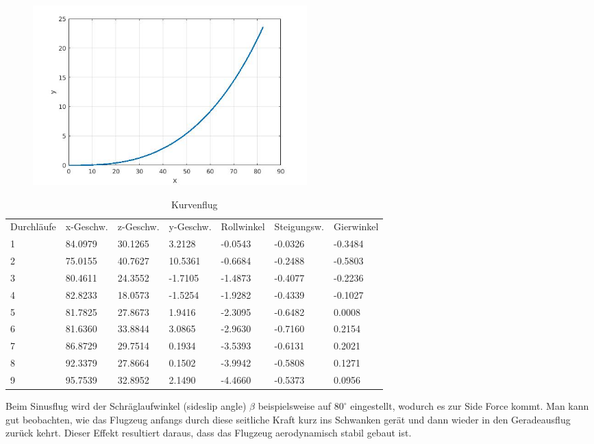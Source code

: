 \documentclass[a4paper,12pt]{scrartcl}
\begin{document}
\begin{figure}[htp]
	\centering
	\includegraphics[width=300pt]{Kurve4.jpg}
	\label{fig:k4}
\end{figure}
\begin{table}
\centering
\caption{Kurvenflug}
\begin{tabular}{lllllll}
Durchläufe & x-Geschw. & z-Geschw. & y-Geschw. & Rollwinkel & Steigungsw. & Gierwinkel  \\
1          & 84.0979   & 30.1265   & 3.2128    & -0.0543    & -0.0326     & -0.3484     \\
2          & 75.0155   & 40.7627   & 10.5361   & -0.6684    & -0.2488     & -0.5803     \\
3          & 80.4611   & 24.3552   & -1.7105   & -1.4873    & -0.4077     & -0.2236     \\
4          & 82.8233   & 18.0573   & -1.5254   & -1.9282    & -0.4339     & -0.1027     \\
5          & 81.7825   & 27.8673   & 1.9416    & -2.3095    & -0.6482     & 0.0008      \\
6          & 81.6360   & 33.8844   & 3.0865    & -2.9630    & -0.7160     & 0.2154      \\
7          & 86.8729   & 29.7514   & 0.1934    & -3.5393    & -0.6131     & 0.2021      \\
8          & 92.3379   & 27.8664   & 0.1502    & -3.9942    & -0.5808     & 0.1271      \\
9          & 95.7539   & 32.8952   & 2.1490    & -4.4660    & -0.5373     & 0.0956     
\end{tabular}
\end{table}
\newpage
Beim Sinusflug wird der Schräglaufwinkel (sideslip angle) \(\beta\) beispielsweise auf \(80^\circ\) eingestellt, wodurch es
zur Side Force kommt. Man kann gut beobachten, wie das Flugzeug anfangs durch diese
seitliche Kraft kurz ins Schwanken gerät und dann wieder in den Geradeausflug zurück
kehrt. Dieser Effekt resultiert daraus, dass das Flugzeug aerodynamisch stabil gebaut ist.
 
\end{document}
